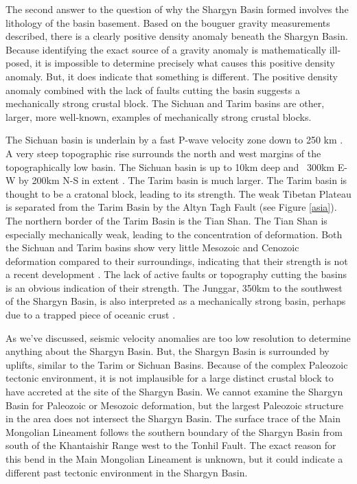 \documentclass[10pt,a4paper]{article}
\begin{document}
	The second answer to the question of why the Shargyn Basin formed involves the lithology of the basin basement. Based on the bouguer gravity measurements described, there is a clearly positive density anomaly beneath the Shargyn Basin. Because identifying the exact source of a gravity anomaly is mathematically ill-posed, it is impossible to determine precisely what causes this positive density anomaly. But, it does indicate that something is different. The positive density anomaly combined with the lack of faults cutting the basin suggests a mechanically strong crustal block. The Sichuan and Tarim basins are other, larger, more well-known, examples of mechanically strong crustal blocks. 
	
	The Sichuan basin is underlain by a fast P-wave velocity zone down to 250 km \citep{Royden2008}. A very steep topographic rise surrounds the north and west margins of the topographically low basin. The Sichuan basin is up to 10km deep and ~300km E-W by 200km N-S in extent \citep{Burchfiel2008}. The Tarim basin is much larger. The Tarim basin is thought to be a cratonal block, leading to its strength. The weak Tibetan Plateau is separated from the Tarim Basin by the Altyn Tagh Fault (see Figure \ref{asia}). The northern border of the Tarim Basin is the Tian Shan. The Tian Shan is especially mechanically weak, leading to the concentration of deformation. Both the Sichuan and Tarim basins show very little Mesozoic and Cenozoic deformation compared to their surroundings, indicating that their strength is not a recent development \citep{Neil1997}. The lack of active faults or topography cutting the basins is an obvious indication of their strength. The Junggar, 350km to the southwest of the Shargyn Basin, is also interpreted as a mechanically strong basin, perhaps due to a trapped piece of oceanic crust \citep{Carroll1990a}. 

	As we've discussed, seismic velocity anomalies are too low resolution to determine anything about the Shargyn Basin. But, the Shargyn Basin is surrounded by uplifts, similar to the Tarim or Sichuan Basins. Because of the complex Paleozoic tectonic environment, it is not implausible for a large distinct crustal block to have accreted at the site of the Shargyn Basin. We cannot examine the Shargyn Basin for Paleozoic or Mesozoic deformation, but the largest Paleozoic structure in the area does not intersect the Shargyn Basin. The surface trace of the Main Mongolian Lineament follows the southern boundary of the Shargyn Basin from south of the Khantaishir Range west to the Tonhil Fault. The exact reason for this bend in the Main Mongolian Lineament is unknown, but it could indicate a different past tectonic environment in the Shargyn Basin.
\end{document}
